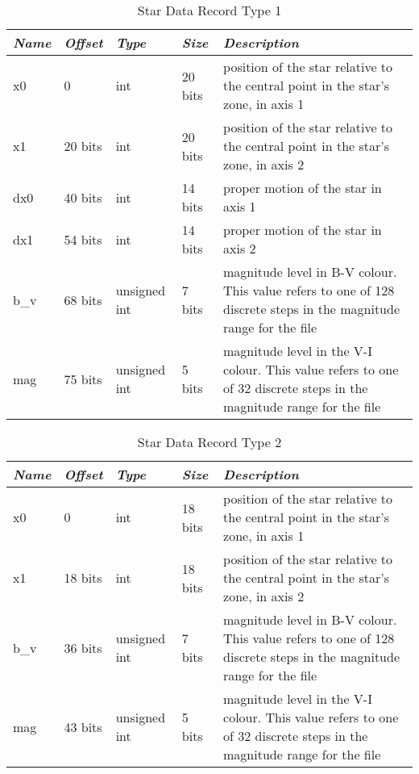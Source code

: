 \begin{table}[htbp]
\begin{tabularx}{\textwidth}{llllX}\toprule
\emph{Name} & \emph{Offset}& \emph{Type} & \emph{Size} &\emph{Description}\\\midrule
x0   &  0      & int          & 20 bits & position of the star relative to the central point in the star's zone, in axis 1\\%
x1   & 20 bits & int          & 20 bits & position of the star relative to the central point in the star's zone, in axis 2\\%
dx0  & 40 bits & int          & 14 bits & proper motion of the star in axis 1\\%
dx1  & 54 bits & int          & 14 bits & proper motion of the star in axis 2\\%
b\_v & 68 bits & unsigned int &  7 bits & magnitude level in B-V colour. This value refers to one of 128 discrete steps 
                                          in the magnitude range for the file\\%
mag  & 75 bits & unsigned int &  5 bits & magnitude level in the V-I colour. This value refers to one of 32 discrete steps 
                                          in the magnitude range for the file\\\bottomrule
\end{tabularx}
\caption{Star Data Record Type 1}
\label{tab:StarDataRecord1}
\end{table}

\begin{table}[htbp]
\begin{tabularx}{\textwidth}{llllX}\toprule
\emph{Name} & \emph{Offset} & \emph{Type} & \emph{Size} & \emph{Description}\\\midrule
x0   & 0       & int          & 18 bits & position of the star relative to the central point in the star's zone, in axis 1\\%
x1   & 18 bits & int          & 18 bits & position of the star relative to the central point in the star's zone, in axis 2\\%
b\_v & 36 bits & unsigned int &  7 bits & magnitude level in B-V colour. This value refers to one of 128 discrete steps 
                                          in the magnitude range for the file\\%
mag  & 43 bits & unsigned int &  5 bits & magnitude level in the V-I colour. This value refers to one of 32 discrete steps 
                                          in the magnitude range for the file\\\bottomrule
\end{tabularx}
\caption{Star Data Record Type 2}
\label{tab:StarDataRecord2}
\end{table}
\clearpage

